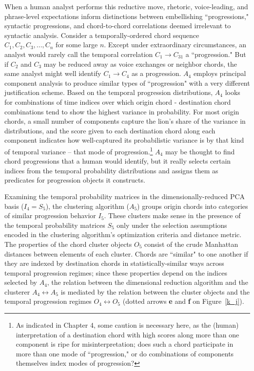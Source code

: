 When a human analyst performs this reductive move, rhetoric, voice-leading, and phrase-level expectations inform distinctions between embellishing ``progressions," syntactic progressions, and chord-to-chord correlations deemed irrelevant to syntactic analysis.  Consider a temporally-ordered chord sequence $C_1, C_2, C_3,...,C_n$ for some large $n$.  Except under extraordinary circumstances, an analyst would rarely call the temporal correlation $C_1 \rightarrow C_31$ a ``progression."  But if $C_2$ and $C_3$ may be reduced away as voice exchanges or neighbor chords, the same analyst might well identify $C_1 \rightarrow C_4$ as a progression.  $A_4$ employs principal component analysis to produce similar types of ``progression" with a very different justification scheme.  Based on the temporal progression distributions, $A_4$ looks for combinations of time indices over which origin chord - destination chord combinations tend to show the highest variance in probability.  For most origin chords, a small number of components capture the lion's share of the variance in distributions, and the score given to each destination chord along each component indicates how well-captured its probabilistic variance is by that kind of temporal variance -- that mode of progression.\footnote{As indicated in Chapter 4, some caution is necessary here, as the (human) interpretation of a destination chord with high scores along more than one component is ripe for misinterpretation; does such a chord participate in more than one mode of ``progression," or do combinations of components themselves index modes of progression?}  $A_4$ may be thought to find chord progressions that a human would identify, but it really selects certain indices from the temporal probability distributions and assigns them as predicates for progression objects it constructs.

Examining the temporal probability matrices in the dimensionally-reduced PCA basis ($I_4 = S_5$), the clustering algorithm ($A_5$) groups origin chords into categories of similar progression behavior $I_5$.  These clusters make sense in the presence of the temporal probability matrices $S_5$ only under the selection assumptions encoded in the clustering algorithm's optimization criteria and distance metric.  The properties of the chord cluster objects $O_5$ consist of the crude Manhattan distances between elements of each cluster.  Chords are ``similar" to one another if they are indexed by destination chords in statistically-similar ways across temporal progression regimes; since these properties depend on the indices selected by $A_4$, the relation between the dimensional reduction algorithm and the clusterer $A_4 \leftrightarrow A_5$ is mediated by the relation between the cluster objects and the temporal progression regimes $O_4 \leftrightarrow O_5$ (dotted arrows \textbf{e} and \textbf{f} on Figure~\ref{k_j}).

